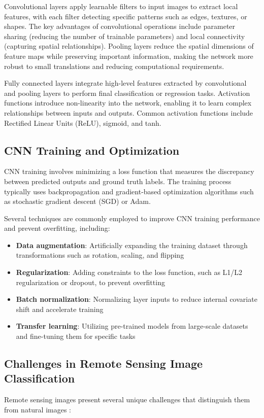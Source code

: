 \documentclass[12pt,a4paper]{article}
\begin{document}
Convolutional layers apply learnable filters to input images to extract local features, with each filter detecting specific patterns such as edges, textures, or shapes. The key advantages of convolutional operations include parameter sharing (reducing the number of trainable parameters) and local connectivity (capturing spatial relationships). Pooling layers reduce the spatial dimensions of feature maps while preserving important information, making the network more robust to small translations and reducing computational requirements.

Fully connected layers integrate high-level features extracted by convolutional and pooling layers to perform final classification or regression tasks. Activation functions introduce non-linearity into the network, enabling it to learn complex relationships between inputs and outputs. Common activation functions include Rectified Linear Units (ReLU), sigmoid, and tanh.

\subsection{CNN Training and Optimization}
CNN training involves minimizing a loss function that measures the discrepancy between predicted outputs and ground truth labels. The training process typically uses backpropagation and gradient-based optimization algorithms such as stochastic gradient descent (SGD) or Adam. 

Several techniques are commonly employed to improve CNN training performance and prevent overfitting, including:
\begin{itemize}
\item \textbf{Data augmentation}: Artificially expanding the training dataset through transformations such as rotation, scaling, and flipping
\item \textbf{Regularization}: Adding constraints to the loss function, such as L1/L2 regularization or dropout, to prevent overfitting
\item \textbf{Batch normalization}: Normalizing layer inputs to reduce internal covariate shift and accelerate training
\item \textbf{Transfer learning}: Utilizing pre-trained models from large-scale datasets and fine-tuning them for specific tasks
\end{itemize}

\subsection{Challenges in Remote Sensing Image Classification}
Remote sensing images present several unique challenges that distinguish them from natural images \cite{zhu2017deep}:
\end{document}

